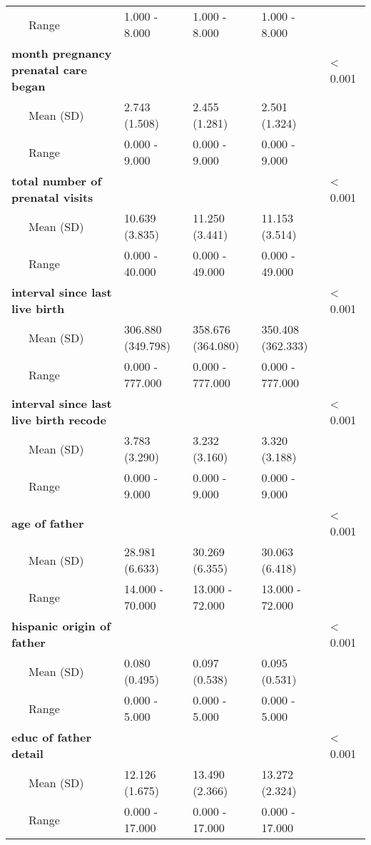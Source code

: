 \begin{longtable}[c]{@{}lllll@{}}
\\\addlinespace
~~~Range & 1.000 - 8.000 & 1.000 - 8.000 & 1.000 - 8.000 &
\\\addlinespace
\textbf{month pregnancy prenatal care began} & & & & \textless{} 0.001
\\\addlinespace
~~~Mean (SD) & 2.743 (1.508) & 2.455 (1.281) & 2.501 (1.324) &
\\\addlinespace
~~~Range & 0.000 - 9.000 & 0.000 - 9.000 & 0.000 - 9.000 &
\\\addlinespace
\textbf{total number of prenatal visits} & & & & \textless{} 0.001
\\\addlinespace
~~~Mean (SD) & 10.639 (3.835) & 11.250 (3.441) & 11.153 (3.514) &
\\\addlinespace
~~~Range & 0.000 - 40.000 & 0.000 - 49.000 & 0.000 - 49.000 &
\\\addlinespace
\textbf{interval since last live birth} & & & & \textless{} 0.001
\\\addlinespace
~~~Mean (SD) & 306.880 (349.798) & 358.676 (364.080) & 350.408 (362.333)
&
\\\addlinespace
~~~Range & 0.000 - 777.000 & 0.000 - 777.000 & 0.000 - 777.000 &
\\\addlinespace
\textbf{interval since last live birth recode} & & & & \textless{} 0.001
\\\addlinespace
~~~Mean (SD) & 3.783 (3.290) & 3.232 (3.160) & 3.320 (3.188) &
\\\addlinespace
~~~Range & 0.000 - 9.000 & 0.000 - 9.000 & 0.000 - 9.000 &
\\\addlinespace
\textbf{age of father} & & & & \textless{} 0.001
\\\addlinespace
~~~Mean (SD) & 28.981 (6.633) & 30.269 (6.355) & 30.063 (6.418) &
\\\addlinespace
~~~Range & 14.000 - 70.000 & 13.000 - 72.000 & 13.000 - 72.000 &
\\\addlinespace
\textbf{hispanic origin of father} & & & & \textless{} 0.001
\\\addlinespace
~~~Mean (SD) & 0.080 (0.495) & 0.097 (0.538) & 0.095 (0.531) &
\\\addlinespace
~~~Range & 0.000 - 5.000 & 0.000 - 5.000 & 0.000 - 5.000 &
\\\addlinespace
\textbf{educ of father detail} & & & & \textless{} 0.001
\\\addlinespace
~~~Mean (SD) & 12.126 (1.675) & 13.490 (2.366) & 13.272 (2.324) &
\\\addlinespace
~~~Range & 0.000 - 17.000 & 0.000 - 17.000 & 0.000 - 17.000 &

\end{longtable}
